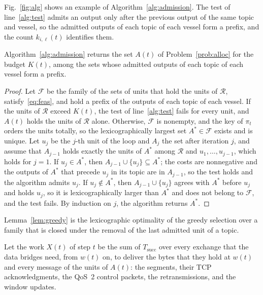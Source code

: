 Fig.~\ref{fig:alg} shows an example of Algorithm~\ref{alg:admission}. The test of line~\ref{alg:test} admits an output only after the previous output of the same topic and vessel, so the admitted outputs of each topic of each vessel form a prefix, and the count $k_{i,\ell}(t)$ identifies them.

\begin{lemma}\label{lem:greedy}
Algorithm~\ref{alg:admission} returns the set $A(t)$ of Problem~\ref{prob:alloc} for the budget $K(t)$, among the sets whose admitted outputs of each topic of each vessel form a prefix.
\end{lemma}
\begin{proof}
Let $\mathcal{F}$ be the family of the sets of units that hold the units of $\mathcal{R}$, satisfy~\eqref{eq:feas}, and hold a prefix of the outputs of each topic of each vessel. If the units of $\mathcal{R}$ exceed $K(t)$, the test of line~\ref{alg:test} fails for every unit, and $A(t)$ holds the units of $\mathcal{R}$ alone. Otherwise, $\mathcal{F}$ is nonempty, and the key of $\pi_t$ orders the units totally, so the lexicographically largest set $A^* \in \mathcal{F}$ exists and is unique. Let $u_j$ be the $j$-th unit of the loop and $A_j$ the set after iteration $j$, and assume that $A_{j-1}$ holds exactly the units of $A^*$ among $\mathcal{R}$ and $u_1, \dots, u_{j-1}$, which holds for $j = 1$. If $u_j \in A^*$, then $A_{j-1} \cup \{u_j\} \subseteq A^*$; the costs are nonnegative and the outputs of $A^*$ that precede $u_j$ in its topic are in $A_{j-1}$, so the test holds and the algorithm admits $u_j$. If $u_j \notin A^*$, then $A_{j-1} \cup \{u_j\}$ agrees with $A^*$ before $u_j$ and holds $u_j$, so it is lexicographically larger than $A^*$ and does not belong to $\mathcal{F}$, and the test fails. By induction on $j$, the algorithm returns $A^*$.
\end{proof}

Lemma~\ref{lem:greedy} is the lexicographic optimality of the greedy selection over a family that is closed under the removal of the last admitted unit of a topic.

Let the work $X(t)$ of step $t$ be the sum of $T_{\mathrm{succ}}$ over every exchange that the data bridges need, from $w(t)$ on, to deliver the bytes that they hold at $w(t)$ and every message of the units of $A(t)$: the segments, their TCP acknowledgments, the QoS~2 control packets, the retransmissions, and the window updates.

